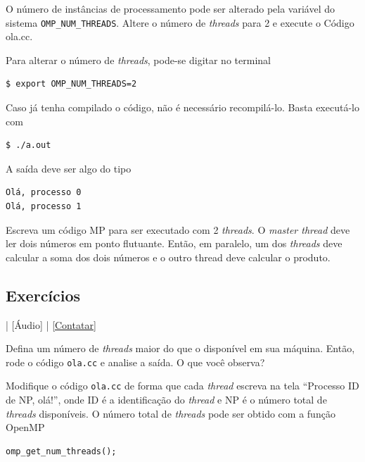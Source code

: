 \begin{exeresol}
  O número de instâncias de processamento pode ser alterado pela variável do sistema \verb+OMP_NUM_THREADS+. Altere o número de {\it threads} para 2 e execute o Código ola.cc.
\end{exeresol}
\begin{resol}
  Para alterar o número de {\it threads}, pode-se digitar no terminal
\begin{verbatim}
$ export OMP_NUM_THREADS=2
\end{verbatim}
  Caso já tenha compilado o código, não é necessário recompilá-lo. Basta executá-lo com
\begin{verbatim}
$ ./a.out
\end{verbatim}
  A saída deve ser algo do tipo
\begin{verbatim}
Olá, processo 0
Olá, processo 1
\end{verbatim}
\end{resol}

\begin{exeresol}
  Escreva um código MP para ser executado com 2 {\it threads}. O {\it master thread} deve ler dois números em ponto flutuante. Então, em paralelo, um dos {\it threads} deve calcular a soma dos dois números e o outro thread deve calcular o produto.
\end{exeresol}
\begin{resol}
  
\end{resol}

\subsection*{Exercícios}

\begin{flushright}
  [Vídeo] | [Áudio] | \href{https://phkonzen.github.io/notas/contato.html}{[Contatar]}
\end{flushright}

\begin{exer}
  Defina um número de {\it threads} maior do que o disponível em sua máquina. Então, rode o código \verb+ola.cc+ e analise a saída. O que você observa?
\end{exer}

\begin{exer}
  Modifique o código \verb+ola.cc+ de forma que cada {\it thread} escreva na tela ``Processo ID de NP, olá!'', onde ID é a identificação do {\it thread} e NP é o número total de {\it threads} disponíveis. O número total de {\it threads} pode ser obtido com a função OpenMP
\begin{verbatim}
omp_get_num_threads();
\end{verbatim}
\end{exer}

